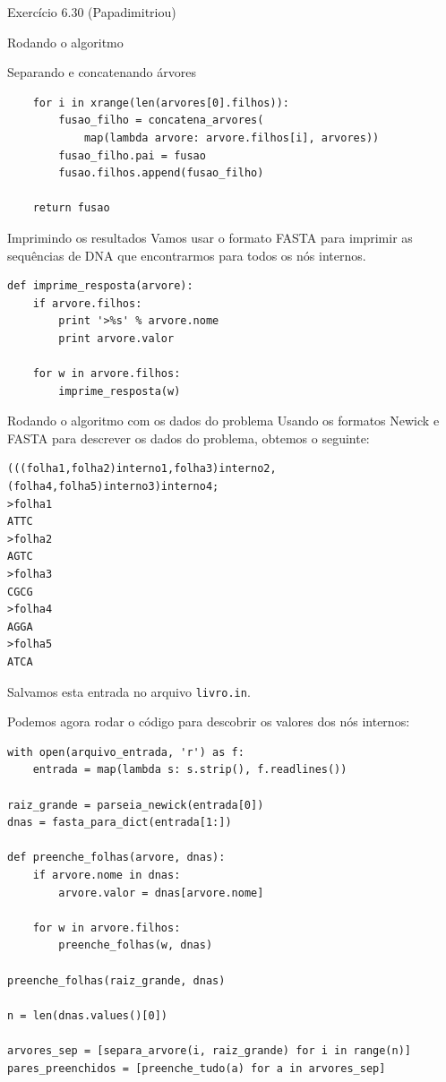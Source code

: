 \documentclass[presentation]{beamer}
\begin{document}
\begin{frame}[fragile,label=sec-4]{Exercício 6.30 (Papadimitriou)}
\begin{block}{Rodando o algoritmo}
\begin{block}{Separando e concatenando árvores}
\begin{verbatim}
    for i in xrange(len(arvores[0].filhos)):
        fusao_filho = concatena_arvores(
            map(lambda arvore: arvore.filhos[i], arvores))
        fusao_filho.pai = fusao
        fusao.filhos.append(fusao_filho)

    return fusao
\end{verbatim}
\end{block}

\begin{block}{Imprimindo os resultados}
Vamos usar o formato FASTA para imprimir as sequências de DNA que
encontrarmos para todos os nós internos.

\begin{verbatim}
def imprime_resposta(arvore):
    if arvore.filhos:
        print '>%s' % arvore.nome
        print arvore.valor

    for w in arvore.filhos:
        imprime_resposta(w)
\end{verbatim}
\end{block}


\begin{block}{Rodando o algoritmo com os dados do problema}
Usando os formatos Newick e FASTA para descrever os dados do problema,
obtemos o seguinte:

\begin{verbatim}
(((folha1,folha2)interno1,folha3)interno2,(folha4,folha5)interno3)interno4;
>folha1
ATTC
>folha2
AGTC
>folha3
CGCG
>folha4
AGGA
>folha5
ATCA
\end{verbatim}

Salvamos esta entrada no arquivo \verb~livro.in~.

Podemos agora rodar o código para descobrir os valores dos nós internos:

\begin{verbatim}
with open(arquivo_entrada, 'r') as f:
    entrada = map(lambda s: s.strip(), f.readlines())

raiz_grande = parseia_newick(entrada[0])
dnas = fasta_para_dict(entrada[1:])

def preenche_folhas(arvore, dnas):
    if arvore.nome in dnas:
        arvore.valor = dnas[arvore.nome]

    for w in arvore.filhos:
        preenche_folhas(w, dnas)

preenche_folhas(raiz_grande, dnas)

n = len(dnas.values()[0])

arvores_sep = [separa_arvore(i, raiz_grande) for i in range(n)]
pares_preenchidos = [preenche_tudo(a) for a in arvores_sep]


\end{verbatim}
\end{block}
\end{block}
\end{frame}
\end{document}
